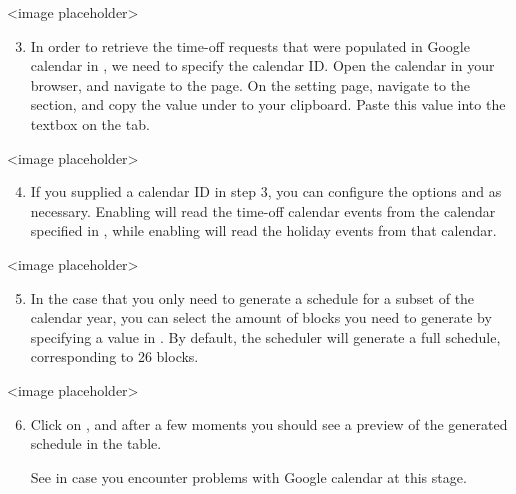 \documentclass[letterpaper,10pt,english]{sphinxmanual}
\begin{document}
\textless{}image placeholder\textgreater{}
\begin{enumerate}
\setcounter{enumi}{2}
\item {} 
 In order to retrieve the time-off requests that were populated
in Google calendar in {\hyperref[\detokenize{index:adding-clinician-requests}]{}}, we need to specify the
calendar ID. Open the calendar in your browser, and navigate to the
 page.
On the setting page, navigate to the  section, and copy
the value under  to your clipboard.
Paste this value into the  textbox on the 
tab.

\end{enumerate}

\textless{}image placeholder\textgreater{}
\begin{enumerate}
\setcounter{enumi}{3}
\item {} 
 If you supplied a calendar ID in step 3, you can configure
the options  and  as necessary.
Enabling  will read the time-off calendar events
from the calendar specified in , while enabling
 will read the holiday events from that calendar.

\end{enumerate}

\textless{}image placeholder\textgreater{}
\begin{enumerate}
\setcounter{enumi}{4}
\item {} 
 In the case that you only need to generate a schedule for
a subset of the calendar year, you can select the amount of blocks you need
to generate by specifying a value in . By default, the
scheduler will generate a full schedule, corresponding to 26 blocks.

\end{enumerate}

\textless{}image placeholder\textgreater{}
\begin{enumerate}
\setcounter{enumi}{5}
\item {} 
Click on , and after a few moments you should see a preview of
the generated schedule in the table.

 See {\hyperref[\detokenize{index:authentication}]{}} in case you encounter problems
with Google calendar at this stage.

\end{enumerate}
\end{document}
